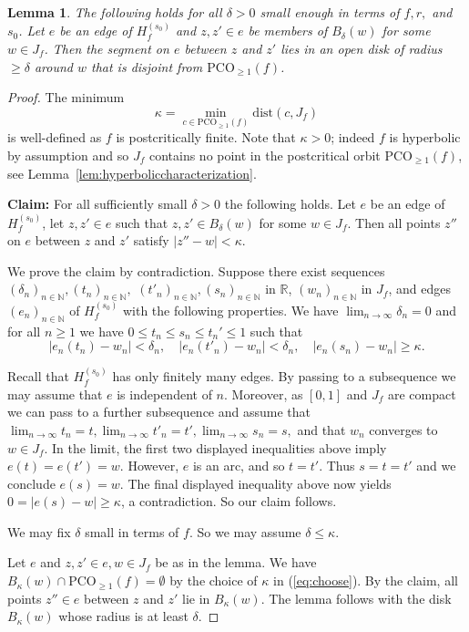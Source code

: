 \documentclass[12pt,oneside,a4]{amsart}
\newcommand{\IN}{\mathbb{N}}
\newcommand{\IR}{\mathbb{R}}
\newcounter{maincounter}
\numberwithin{maincounter}{section}
\numberwithin{equation}{section}
\newtheorem{lemma}[maincounter]{Lemma}
\newcommand{\pco}{\mathrm{PCO}}
\begin{document}
\begin{lemma}
  \label{lem:smallepsilonpcfhyp}
  The following holds for all $\delta >
  0$ small enough in terms of $f,r,$ and $s_0$. Let $e$ be an edge of
  $H_f^{(s_0)}$ and $z,z'\in e$ be members of $B_\delta(w)$ for some
  $w\in J_f$. Then the segment on $e$ between $z$ and $z'$ lies in an
  open disk of radius $\ge \delta$ around $w$ that is disjoint from
  $\pco_{\ge 1}(f)$.  
\end{lemma}
\begin{proof}  
  The minimum
  \begin{equation}
    \label{eq:choose}
    \kappa = \min_{c\in \pco_{\ge 1}(f)} \mathrm{dist}(c,J_f)
  \end{equation}
  is well-defined as $f$ is postcritically finite. Note that $\kappa>0$;
  indeed $f$ is hyperbolic by assumption and so 
  $J_f$ contains no  point
  in the postcritical orbit $\pco_{\ge 1}(f)$, see
  Lemma~\ref{lem:hyperboliccharacterization}.
  
  \textbf{Claim:} For all sufficiently small  $\delta > 0$ the
  following holds.  Let $e$ be an edge of 
  $H_f^{(s_0)}$, let $z,z'\in e$ such that
  $z,z'\in B_\delta(w)$ for some $w\in J_f$. 
  Then all points $z''$ on $e$ between $z$ and $z'$ satisfy
  $|z''-w|<\kappa$.

  We prove the claim by contradiction. Suppose there exist sequences
  $(\delta_n)_{n\in\IN},(t_n)_{n\in\IN},$
  $(t'_n)_{n\in\IN},(s_n)_{n\in\IN}$ in $\IR$, $(w_n)_{n\in\IN}$ in
  $J_f$, and edges $(e_n)_{n\in \IN}$ of $H_f^{(s_0)}$ with the
  following properties. We have $\lim_{n\rightarrow \infty}\delta_n=0$
  and for all $n\ge 1$ we have 
  $0\le t_n\le s_n\le t_n'\le 1$ such that
  \begin{equation*}
    |e_n(t_n)-w_n|<\delta_n, \quad |e_n(t'_n)-w_n|<\delta_n, \quad
    |e_n(s_n)-w_n| \ge \kappa.
  \end{equation*}

  Recall that $H_f^{(s_0)}$ has only finitely many edges.
  By passing to a subsequence we may assume that $e$ is independent
  of $n$. 
  Moreover, as $[0,1]$ and $J_f$ are compact we can pass to a further
  subsequence and assume that
  $\lim_{n\rightarrow\infty} t_n=t,  \lim_{n\rightarrow\infty}
  t'_n=t',\lim_{n\rightarrow\infty} s_n=s,$ and that $w_n$ converges
  to $w\in J_f$. 
  In the limit, the first two displayed inequalities above imply $e(t) = e(t')=w$. However, $e$ is an
  arc, and so $t=t'$. Thus $s=t=t'$ and we conclude $e(s)=w$. 
  The final displayed inequality above now yields $0=|e(s)-w| \ge \kappa$, a
  contradiction. So our claim follows. 

  We may fix
  $\delta$ small in terms of $f$. So we may assume
  $\delta \le \kappa$.
  
  Let $e$ and $z,z'\in e,w\in J_f$ be as in the lemma.   
  We have $B_\kappa(w)\cap \pco_{\ge 1}(f)=\emptyset$
  by the choice of $\kappa$ in (\ref{eq:choose}).
  By the claim, all points $z''\in e$ between $z$ and $z'$ lie in
  $B_\kappa(w)$.
  The lemma follows with the disk $B_\kappa(w)$ whose radius is at
  least $\delta$.
\end{proof}
\end{document}
